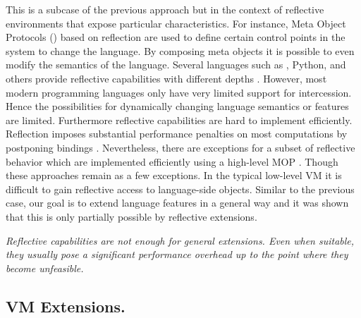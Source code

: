 This is a subcase of the previous approach but in the context of reflective environments that expose particular characteristics.
For instance, Meta Object Protocols (\MOP) \cite{Kicz91a} based on reflection \cite{Maes87a} are used to define certain control points in the system to change the language.
By composing meta objects it is possible to even modify the semantics of the language. 
Several languages such as \ST, Python, and others provide reflective capabilities with different depths \cite{Ande98a,Flan08a,Van10a}.
However, most modern programming languages only have very limited support for intercession.
Hence the possibilities for dynamically changing language semantics or features are limited. 
Furthermore reflective capabilities are hard to implement efficiently.
Reflection imposes substantial performance penalties on most computations by postponing bindings \cite{Male96a}. 
Nevertheless, there are exceptions for a subset of reflective behavior which are implemented efficiently using a high-level MOP \cite{Vran12a}.
Though these approaches remain as a few exceptions.
In the typical low-level VM it is difficult to gain reflective access to language-side objects.
Similar to the previous case, our goal is to extend language features in a general way and it was shown that this is only partially possible by reflective extensions. 

\noindent\emph{Reflective capabilities are not enough for general extensions. Even when suitable, they usually pose a significant performance overhead up to the point where they become unfeasible.}

\subsection{VM Extensions.}

